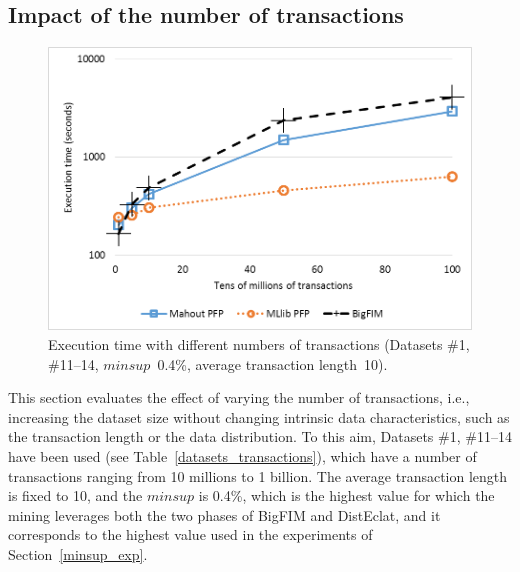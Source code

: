 



\subsection{Impact of the number of transactions}
\label{transaction_exp}

\begin{figure}[!t]
\includegraphics[width=5in]{chapters/survey/immagini/transactions_log.png}
\caption{Execution time with different numbers of transactions
 (Datasets \#1, \#11--14,
 $minsup$~0.4\%,
 average transaction length~10).}
\label{transactions}
\end{figure}

This section evaluates the effect of varying the number of transactions,
i.e., increasing the dataset size without changing intrinsic data characteristics,
such as the transaction length or the data distribution.
To this aim, Datasets \#1, \#11--14 have been used
(see Table~\ref{datasets_transactions}),
which have a number of transactions
ranging from 10 millions to 1 billion.
The average transaction length is fixed to 10, and the $minsup$ is 0.4\%,
which is the highest value for which the mining leverages both the two phases of
BigFIM and DistEclat, and it corresponds to the highest value used
in the experiments of Section~\ref{minsup_exp}.


